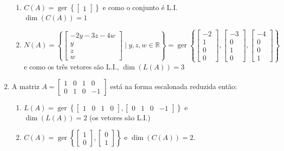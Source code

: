 \documentclass[12pt,a4paper]{article}
\newcommand*\ger[1]{\operatorname{ger}\left\{#1\right\}}
\newcommand*\R{\mathbb{R}}
\begin{document}
\begin{enumerate}
\begin{enumerate}
\begin{enumerate}
\item
$C(A) = \ger{ \begin{bmatrix}
1
\end{bmatrix} }$ e como o conjunto é L.I. $\dim(C(A)) = 1$

\item $N(A) = \left\{ \begin{bmatrix}
-2y-3z-4w\\y\\z\\w
\end{bmatrix} \mid y,z,w\in \R
\right\}
=
\ger{ \begin{bmatrix}
-2\\1\\0\\0
\end{bmatrix},
\begin{bmatrix}
-3\\0\\1\\0
\end{bmatrix},
\begin{bmatrix}
-4\\0\\0\\1
\end{bmatrix}  }$ e como os três vetores são L.I., $\dim(L(A)) = 3$

\end{enumerate}

\item A matriz $A = \begin{bmatrix}
1 & 0 & 1 & 0 \\
0 & 1 & 0 & -1
\end{bmatrix}$ está na forma escalonada reduzida então:
\begin{enumerate}
\item $L(A) = \ger{ \begin{bmatrix}
1 & 0 & 1 & 0
\end{bmatrix}, \begin{bmatrix}
0 & 1 & 0 & -1
\end{bmatrix} }$ e $\dim(L(A)) = 2$ (os vetores são L.I.)

\item $C(A) = \ger{ \begin{bmatrix}
1 \\ 0
\end{bmatrix}, \begin{bmatrix}
0 \\ 1
\end{bmatrix} }$ e $\dim(C(A)) = 2$.


\end{enumerate}
\end{enumerate}
\end{enumerate}
\end{document}
